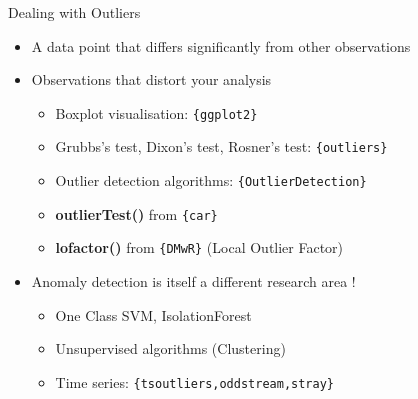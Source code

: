 \documentclass[12pt,ignorenonframetext,]{beamer}
\providecommand{\tightlist}{%
  \setlength{\itemsep}{0pt}\setlength{\parskip}{0pt}}
\begin{document}
\begin{frame}{Dealing with Outliers}
\protect\hypertarget{dealing-with-outliers}{}

\begin{itemize}
\tightlist
\item
  A data point that differs significantly from other observations\\
  \vspace{2mm}
\item
  Observations that distort your analysis

  \begin{itemize}
      \item Boxplot visualisation: \texttt{\{ggplot2\}}
      \item Grubbs’s test, Dixon’s test, Rosner’s test: \texttt{\{outliers\}}
      \item Outlier detection algorithms: \texttt{\{OutlierDetection\}}
      \item \textbf{outlierTest()} from \texttt{\{car\}}
      \item \textbf{lofactor()} from \texttt{\{DMwR\}} (Local Outlier Factor)
  \end{itemize}
   \vspace{2mm}
\item
  Anomaly detection is itself a different research area !

  \begin{itemize}
      \item One Class SVM, IsolationForest
      \item Unsupervised algorithms (Clustering)
      \item Time series: \texttt{\{tsoutliers,oddstream,stray\}}
  \end{itemize}
\end{itemize}

\end{frame}
\end{document}
